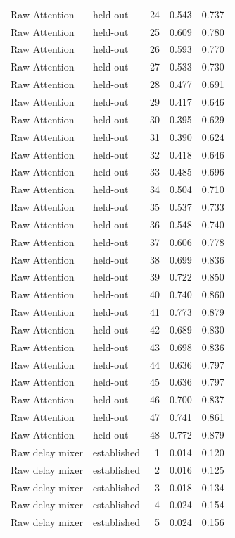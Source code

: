 \begin{tabular}{llrrr}
Raw Attention & held-out & 24 & 0.543 & 0.737 \\
Raw Attention & held-out & 25 & 0.609 & 0.780 \\
Raw Attention & held-out & 26 & 0.593 & 0.770 \\
Raw Attention & held-out & 27 & 0.533 & 0.730 \\
Raw Attention & held-out & 28 & 0.477 & 0.691 \\
Raw Attention & held-out & 29 & 0.417 & 0.646 \\
Raw Attention & held-out & 30 & 0.395 & 0.629 \\
Raw Attention & held-out & 31 & 0.390 & 0.624 \\
Raw Attention & held-out & 32 & 0.418 & 0.646 \\
Raw Attention & held-out & 33 & 0.485 & 0.696 \\
Raw Attention & held-out & 34 & 0.504 & 0.710 \\
Raw Attention & held-out & 35 & 0.537 & 0.733 \\
Raw Attention & held-out & 36 & 0.548 & 0.740 \\
Raw Attention & held-out & 37 & 0.606 & 0.778 \\
Raw Attention & held-out & 38 & 0.699 & 0.836 \\
Raw Attention & held-out & 39 & 0.722 & 0.850 \\
Raw Attention & held-out & 40 & 0.740 & 0.860 \\
Raw Attention & held-out & 41 & 0.773 & 0.879 \\
Raw Attention & held-out & 42 & 0.689 & 0.830 \\
Raw Attention & held-out & 43 & 0.698 & 0.836 \\
Raw Attention & held-out & 44 & 0.636 & 0.797 \\
Raw Attention & held-out & 45 & 0.636 & 0.797 \\
Raw Attention & held-out & 46 & 0.700 & 0.837 \\
Raw Attention & held-out & 47 & 0.741 & 0.861 \\
Raw Attention & held-out & 48 & 0.772 & 0.879 \\
Raw delay mixer & established & 1 & 0.014 & 0.120 \\
Raw delay mixer & established & 2 & 0.016 & 0.125 \\
Raw delay mixer & established & 3 & 0.018 & 0.134 \\
Raw delay mixer & established & 4 & 0.024 & 0.154 \\
Raw delay mixer & established & 5 & 0.024 & 0.156 \\

\end{tabular}
